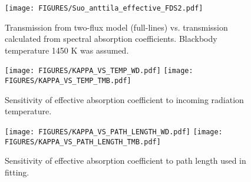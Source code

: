\begin{figure}[ht]
    \centering
    \texttt{[image: FIGURES/Suo\_anttila\_effective\_FDS2.pdf]}
    \caption{Transmission from two-flux model (full-lines) vs. transmission calculated from spectral absorption coefficients. Blackbody temperature 1450 K was assumed.}
    \label{fig_trans3}
\end{figure}

\begin{figure}[ht]
    \centering
    \texttt{[image: FIGURES/KAPPA\_VS\_TEMP\_WD.pdf]}
    \texttt{[image: FIGURES/KAPPA\_VS\_TEMP\_TMB.pdf]}

    \caption{Sensitivity of effective absorption coefficient to incoming radiation temperature.}
    \label{fig_kapvtemp}
\end{figure}

\begin{figure}[ht]
    \centering
    \texttt{[image: FIGURES/KAPPA\_VS\_PATH\_LENGTH\_WD.pdf]}
    \texttt{[image: FIGURES/KAPPA\_VS\_PATH\_LENGTH\_TMB.pdf]}

    \caption{Sensitivity of effective absorption coefficient to path length used in fitting.}
    \label{fig_kapvPlength}
\end{figure}
